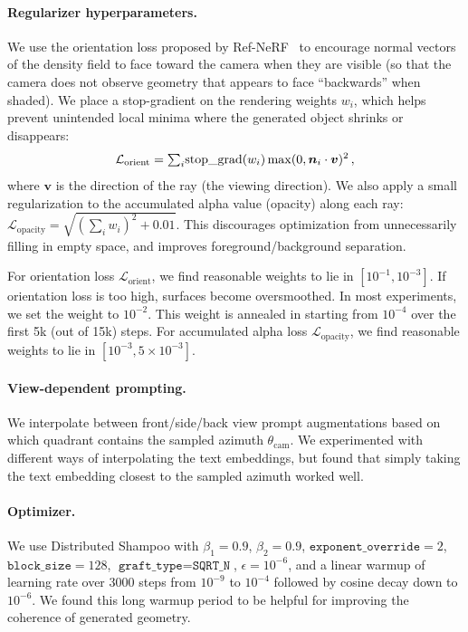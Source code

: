 \documentclass{article} %
\newcommand{\az}{\theta_{\textrm{cam}}}
\begin{document}
\paragraph{Regularizer hyperparameters.} 
We use the orientation loss proposed by Ref-NeRF~\citep{verbin2022refnerf} to encourage normal vectors of the density field to face toward the camera when they are visible (so that the camera does not observe geometry that appears to face ``backwards'' when shaded). We place a stop-gradient on the rendering weights $w_i$, which helps prevent unintended local minima where the generated object shrinks or disappears:
\begin{equation}
    \mathcal L_{\mathrm{orient}} = {\textstyle\sum_i} \mathrm{stop\_grad}(w_i) \max(0, \boldsymbol{n}_i \cdot \boldsymbol{v})^2 \, ,
\end{equation}
where $\boldsymbol v$ is the direction of the ray (the viewing direction).
We also apply a small regularization to the accumulated alpha value (opacity) along each ray: $\mathcal L_{\mathrm{opacity}} = \sqrt{(\sum_i w_i)^2 +0.01}$. This discourages optimization from unnecessarily filling in empty space, and improves foreground/background separation.


For orientation loss $\mathcal L_\textrm{orient}$, we find reasonable weights to lie in $[10^{-1}, 10^{-3}]$. If orientation loss is too high, surfaces become oversmoothed. In most experiments, we set the weight to $10^{-2}$. This weight is annealed in starting from $10^{-4}$ over the first 5k (out of 15k) steps.
For accumulated alpha loss  $\mathcal L_\textrm{opacity}$, we find reasonable weights to lie in $[10^{-3}, 5 \times 10^{-3}]$.

\paragraph{View-dependent prompting.} We interpolate between front/side/back view prompt augmentations based on which quadrant contains the sampled azimuth $\az$. We experimented with different ways of interpolating the text embeddings, but found that simply taking the text embedding closest to the sampled azimuth worked well. 

\paragraph{Optimizer.}
We use Distributed Shampoo \citep{distributedshampoo}
 with $\beta_1=0.9$, $\beta_2=0.9$, $\texttt{exponent\_override}=2$, $\texttt{block\_size}=128$, $\texttt{graft\_type}=\texttt{SQRT\_N}$, $\epsilon=10^{-6}$, and a linear warmup of learning rate over 3000 steps from $10^{-9}$ to $10^{-4}$ followed by cosine decay down to $10^{-6}$. We found this long warmup period to be helpful for improving the coherence of generated geometry.
\end{document}

